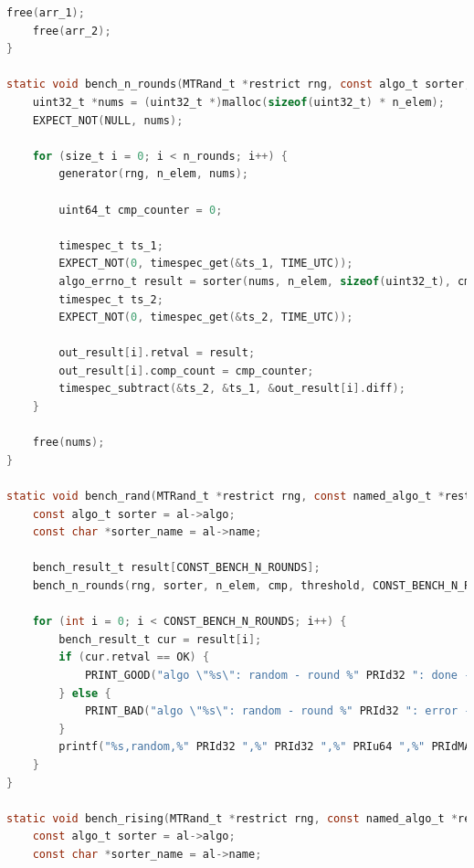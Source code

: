 \documentclass[12pt]{article}
\begin{document}
\begin{lstlisting}[language=C]
    free(arr_1);
    free(arr_2);
}

static void bench_n_rounds(MTRand_t *restrict rng, const algo_t sorter, size_t n_elem, comp_t cmp, uint64_t threshold, size_t n_rounds, gen_data_t generator, bench_result_t *restrict out_result) {
    uint32_t *nums = (uint32_t *)malloc(sizeof(uint32_t) * n_elem);
    EXPECT_NOT(NULL, nums);

    for (size_t i = 0; i < n_rounds; i++) {
        generator(rng, n_elem, nums);

        uint64_t cmp_counter = 0;

        timespec_t ts_1;
        EXPECT_NOT(0, timespec_get(&ts_1, TIME_UTC));
        algo_errno_t result = sorter(nums, n_elem, sizeof(uint32_t), cmp, threshold, &cmp_counter);
        timespec_t ts_2;
        EXPECT_NOT(0, timespec_get(&ts_2, TIME_UTC));

        out_result[i].retval = result;
        out_result[i].comp_count = cmp_counter;
        timespec_subtract(&ts_2, &ts_1, &out_result[i].diff);
    }

    free(nums);
}

static void bench_rand(MTRand_t *restrict rng, const named_algo_t *restrict al, size_t n_elem, comp_t cmp, uint64_t threshold) {
    const algo_t sorter = al->algo;
    const char *sorter_name = al->name;

    bench_result_t result[CONST_BENCH_N_ROUNDS];
    bench_n_rounds(rng, sorter, n_elem, cmp, threshold, CONST_BENCH_N_ROUNDS, gen_rand_data, result);

    for (int i = 0; i < CONST_BENCH_N_ROUNDS; i++) {
        bench_result_t cur = result[i];
        if (cur.retval == OK) {
            PRINT_GOOD("algo \"%s\": random - round %" PRId32 ": done - %" PRIu64 " comps - %" PRIdMAX ".%09" PRId32 " sec\n", sorter_name, i + 1, cur.comp_count, (intmax_t)cur.diff.tv_sec, cur.diff.tv_nsec);
        } else {
            PRINT_BAD("algo \"%s\": random - round %" PRId32 ": error - %" PRIu64 " comps - %" PRIdMAX ".%09" PRId32 " sec\n", sorter_name, i + 1, cur.comp_count, (intmax_t)cur.diff.tv_sec, cur.diff.tv_nsec);
        }
        printf("%s,random,%" PRId32 ",%" PRId32 ",%" PRIu64 ",%" PRIdMAX ".%09" PRId32 "\n", sorter_name, cur.retval, i + 1, cur.comp_count, (intmax_t)cur.diff.tv_sec, cur.diff.tv_nsec);
    }
}

static void bench_rising(MTRand_t *restrict rng, const named_algo_t *restrict al, size_t n_elem, comp_t cmp, uint64_t threshold) {
    const algo_t sorter = al->algo;
    const char *sorter_name = al->name;


\end{lstlisting}
\end{document}
